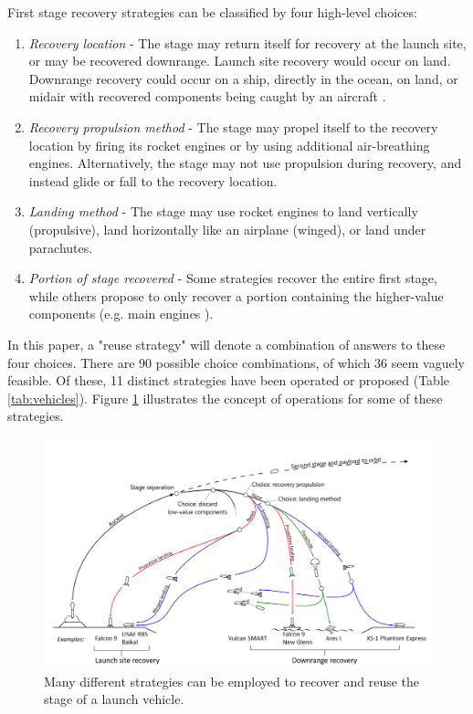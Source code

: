 \documentclass[conf]{new-aiaa}
\begin{document}
\begin{multicols}{2}
First stage recovery strategies can be classified by four high-level choices:
\begin{enumerate}
    \item \textit{Recovery location} - The stage may return itself for recovery at the launch site, or may be recovered downrange. Launch site recovery would occur on land. Downrange recovery could occur on a ship, directly in the ocean, on land, or midair with recovered components being caught by an aircraft \cite{Ragab2015, Stappert2017}.

    \item \textit{Recovery propulsion method} - The stage may propel itself to the recovery location by firing its rocket engines or by using additional air-breathing engines. Alternatively, the stage may not use propulsion during recovery, and instead glide or fall to the recovery location.

    \item \textit{Landing method} - The stage may use rocket engines to land vertically (propulsive), land horizontally like an airplane (winged), or land under parachutes.

    \item \textit{Portion of  stage recovered} - Some strategies recover the entire first stage, while others propose to only recover a portion containing the higher-value components (e.g. main engines \cite{Ragab2015}).
\end{enumerate}

In this paper, a "reuse strategy" will denote a combination of answers to these four choices. There are 90 possible choice combinations, of which 36 seem vaguely feasible. Of these, 11 distinct strategies have been operated or proposed (Table \ref{tab:vehicles}). Figure \ref{fig:recov_strat_diagram} illustrates the concept of operations for some of these strategies.

\begin{figure}
    \centering
    \includegraphics[width=1\textwidth]{figures/recovery_options_annotated}
    \caption{\label{fig:recov_strat_diagram} Many different strategies can be employed to recover and reuse the  stage of a launch vehicle.}
\end{figure}


\end{multicols}
\end{document}
